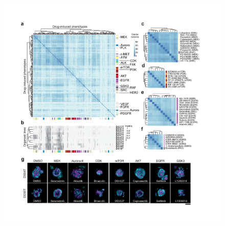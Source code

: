 \begin{flushleft}
\begin{figure}[h]
\centering
\includegraphics[width=\textwidth,
                height=\textheight,
                keepaspectratio]{figures/promise/pdf/fig_3_1.pdf}
\caption{}
\label{fig_231}
\end{figure}
\bigbreak


\end{flushleft}

